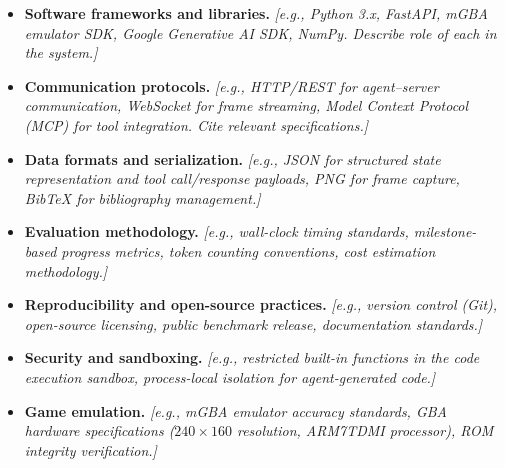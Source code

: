 \begin{itemize}
    \item \textbf{Software frameworks and libraries.} \textit{[e.g., Python 3.x, FastAPI, mGBA emulator SDK, Google Generative AI SDK, NumPy. Describe role of each in the system.]}
    \item \textbf{Communication protocols.} \textit{[e.g., HTTP/REST for agent--server communication, WebSocket for frame streaming, Model Context Protocol (MCP) for tool integration. Cite relevant specifications.]}
    \item \textbf{Data formats and serialization.} \textit{[e.g., JSON for structured state representation and tool call/response payloads, PNG for frame capture, BibTeX for bibliography management.]}
    \item \textbf{Evaluation methodology.} \textit{[e.g., wall-clock timing standards, milestone-based progress metrics, token counting conventions, cost estimation methodology.]}
    \item \textbf{Reproducibility and open-source practices.} \textit{[e.g., version control (Git), open-source licensing, public benchmark release, documentation standards.]}
    \item \textbf{Security and sandboxing.} \textit{[e.g., restricted built-in functions in the code execution sandbox, process-local isolation for agent-generated code.]}
    \item \textbf{Game emulation.} \textit{[e.g., mGBA emulator accuracy standards, GBA hardware specifications ($240 \times 160$ resolution, ARM7TDMI processor), ROM integrity verification.]}
\end{itemize}
